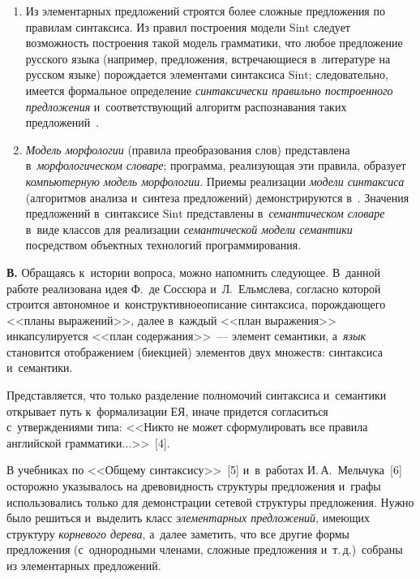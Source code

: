 \begin{multicols}{2}
\begin{enumerate}[1.]
    \item Из элементарных предложений строятся более сложные 
предложения по правилам синтаксиса. Из правил построения модели $\mathrm{Sint}$ 
следует возможность построения такой модель грамматики, что любое 
предложение русского языка (например, предложения, встречающиеся 
в~литературе на русском языке) порождается элементами синтаксиса $\mathrm{Sint}$; 
следовательно, имеется формальное определение \textit{синтаксически 
правильно построенного предложения} и~соответствующий алгоритм 
распознавания таких предложений~\cite{2-shi}.
    \item \textit{Модель морфологии} (правила преобразования слов) 
представлена в~\textit{морфологическом словаре}; программа, реализующая 
эти правила, образует \textit{компьютерную модель морфологии}. Приемы 
реализации \textit{модели синтаксиса} (алгоритмов анализа и~синтеза 
предложений) демонстрируются в~\cite{3-shi}. Значения предложений 
в~синтаксисе $\mathrm{Sint}$ представлены в~\textit{семантическом словаре} в~виде 
классов для реализации \textit{семантической модели семантики} 
посредством объектных технологий программирования.
    \end{enumerate}
    
    \textbf{В.} Обращаясь к~истории вопроса, можно на\-пом\-нить следующее. 
В~данной работе реализована идея Ф.~де Сос\-сю\-ра и~Л.~Ельм\-сле\-ва, 
согласно которой строится автономное и~конструктивное\linebreak описание 
синтаксиса, порождающего <<планы выражений>>, далее в~каждый <<план 
выражения>> инкапсулируется <<план содержания>>~--- элемент 
семантики, а~\textit{язык} становится отображением (биекцией) элементов 
двух множеств: синтаксиса и~семантики.
    
    Представляется, что только разделение полномочий синтаксиса 
и~семантики открывает путь к~формализации ЕЯ, иначе придется 
согласиться с~утверждениями типа: <<Никто не может сформулировать все 
правила английской грамматики$\ldots$>>~[4].
    
    В учебниках по <<Общему синтаксису>>~[5] и~в~работах 
И.\,А.~Мельчука~[6] осторожно указывалось на древовидность структуры 
предложения и~графы использовались только для демонстрации сетевой 
структуры предложения. Нужно было решиться и~выделить класс 
\textit{элементарных предложений}, имеющих структуру \textit{корневого 
дерева}, а~далее заметить, что все другие формы предложения 
(с~однородными членами, сложные предложения и~т.\,д.)\ собраны из 
элементарных предложений.
    

\end{multicols}
